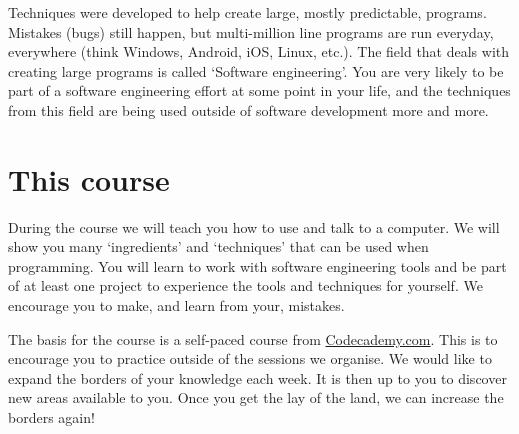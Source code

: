 	Techniques were developed to help create large, mostly predictable, programs.
	Mistakes (bugs) still happen, but multi-million line programs are run everyday, everywhere (think Windows, Android, iOS, Linux, etc.).
	The field that deals with creating large programs is called `Software engineering'.
	You are very likely to be part of a software engineering effort at some point in your life, and the techniques from this field are being used outside of software development more and more.

	\section{This course}
	
	During the course we will teach you how to use and talk to a computer. 
	We will show you many `ingredients' and `techniques' that can be used when programming.
	You will learn to work with software engineering tools and be part of at least one project to experience the tools and techniques for yourself.
	We encourage you to make, and learn from your, mistakes.
	
	The basis for the course is a self-paced course from \url{Codecademy.com}.
	This is to encourage you to practice outside of the sessions we organise.
	We would like to expand the borders of your knowledge each week.
	It is then up to you to discover new areas available to you.
	Once you get the lay of the land, we can increase the borders again!
